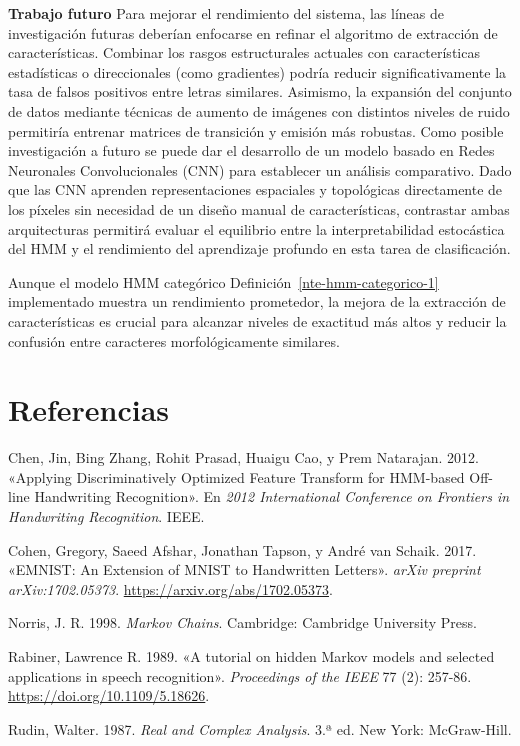 \documentclass[
  spanish,
  us-letterpaper,
  DIV=11,
  numbers=noendperiod]{scrreprt}
\newlength{\cslhangindent}
\newenvironment{CSLReferences}[2] %
 {\begin{list}{}{%
  \setlength{\itemindent}{0pt}
  \setlength{\leftmargin}{0pt}
  \setlength{\parsep}{0pt}
  \ifodd #1
   \setlength{\leftmargin}{\cslhangindent}
   \setlength{\itemindent}{-1\cslhangindent}
  \fi
  \setlength{\itemsep}{#2\baselineskip}}}
 {\end{list}}
\begin{document}
\textbf{Trabajo futuro} Para mejorar el rendimiento del sistema, las
líneas de investigación futuras deberían enfocarse en refinar el
algoritmo de extracción de características. Combinar los rasgos
estructurales actuales con características estadísticas o direccionales
(como gradientes) podría reducir significativamente la tasa de falsos
positivos entre letras similares. Asimismo, la expansión del conjunto de
datos mediante técnicas de aumento de imágenes con distintos niveles de
ruido permitiría entrenar matrices de transición y emisión más robustas.
Como posible investigación a futuro se puede dar el desarrollo de un
modelo basado en Redes Neuronales Convolucionales (CNN) para establecer
un análisis comparativo. Dado que las CNN aprenden representaciones
espaciales y topológicas directamente de los píxeles sin necesidad de un
diseño manual de características, contrastar ambas arquitecturas
permitirá evaluar el equilibrio entre la interpretabilidad estocástica
del HMM y el rendimiento del aprendizaje profundo en esta tarea de
clasificación.

Aunque el modelo HMM categórico Definición~\ref{nte-hmm-categorico-1}
implementado muestra un rendimiento prometedor, la mejora de la
extracción de características es crucial para alcanzar niveles de
exactitud más altos y reducir la confusión entre caracteres
morfológicamente similares.


\chapter{Referencias}\label{referencias}

\label{refs}
\begin{CSLReferences}{1}{0}
Chen, Jin, Bing Zhang, Rohit Prasad, Huaigu Cao, y Prem Natarajan. 2012.
{«Applying Discriminatively Optimized Feature Transform for HMM-based
Off-line Handwriting Recognition»}. En \emph{2012 International
Conference on Frontiers in Handwriting Recognition}. IEEE.

Cohen, Gregory, Saeed Afshar, Jonathan Tapson, y André van Schaik. 2017.
{«{EMNIST}: An Extension of {MNIST} to Handwritten Letters»}.
\emph{arXiv preprint arXiv:1702.05373}.
\url{https://arxiv.org/abs/1702.05373}.

Norris, J. R. 1998. \emph{Markov Chains}. Cambridge: Cambridge
University Press.

Rabiner, Lawrence R. 1989. {«A tutorial on hidden Markov models and
selected applications in speech recognition»}. \emph{Proceedings of the
IEEE} 77 (2): 257-86. \url{https://doi.org/10.1109/5.18626}.

Rudin, Walter. 1987. \emph{Real and Complex Analysis}. 3.ª ed. New York:
McGraw-Hill.

\end{CSLReferences}
\end{document}
